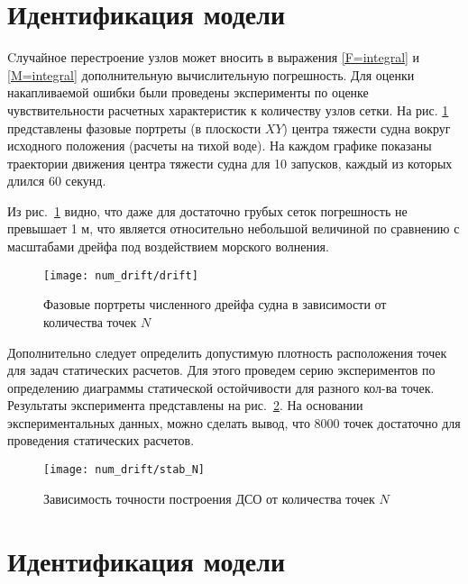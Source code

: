 \section{Идентификация модели}

Cлучайное перестроение узлов может вносить в выражения \eqref{F=integral} и \eqref{M=integral} дополнительную вычислительную погрешность. Для оценки накапливаемой ошибки были проведены эксперименты по оценке чувствительности расчетных характеристик к количеству узлов сетки. На рис. \ref{drift} представлены фазовые портреты  (в плоскости $XY$) центра тяжести судна вокруг исходного положения (расчеты на тихой воде). На каждом графике показаны траектории движения центра тяжести судна для 10 запусков, каждый из которых длился 60 секунд.

Из рис.~\ref{drift} видно, что даже для достаточно грубых сеток погрешность не превышает 1 м, что является относительно небольшой величиной по сравнению с масштабами дрейфа под воздействием морского волнения.

\begin{figure}[h!]
\begin{center}
\texttt{[image: num\_drift/drift]}
\end{center}
\caption{Фазовые портреты численного дрейфа судна в зависимости от количества точек $N$ }
\label{drift}
\end{figure}

Дополнительно следует определить допустимую плотность расположения точек для задач статических расчетов.
Для этого проведем серию экспериментов по определению диаграммы статической остойчивости для разного кол-ва точек. Результаты эксперимента представлены на рис.~\ref{drift:stabNN}. На основании экспериментальных данных, можно сделать вывод, что 8000 точек достаточно для проведения статических расчетов.

\begin{figure}[h!]
\begin{center}
\texttt{[image: num\_drift/stab\_N]}
\end{center}
\caption{Зависимость точности построения ДСО от количества точек $N$ }
\label{drift:stabNN}
\end{figure}



\section{Идентификация модели}

